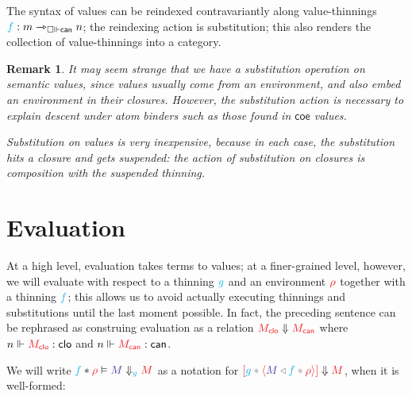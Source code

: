 \documentclass{article}
\DeclarePairedDelimiter\Parens{\lparen}{\rparen}
\newtheorem{remark}{Remark}
\newcommand\FmtKwd[1]{\mathsf{#1}}
\newcommand\FmtThin[1]{{\color{ProcessBlue}#1}}
\newcommand\XThin[3]{{#2}\rightarrowtriangle_{#1}{#3}}
\newcommand\IsXThin[4]{\FmtThin{#1}:\XThin{#2}{#3}{#4}}
\newcommand\FmtTm[1]{{\color{Violet}#1}}
\newcommand\FmtVal[1]{{\color{Red}{#1}}}
\begin{document}
The syntax of values can be reindexed contravariantly along
value-thinnings $\IsXThin{f}{\Val{\square}{\SortCan}}{m}{n}$; the
reindexing action is substitution; this also renders the collection of
value-thinnings into a category.

\begin{remark}
  It may seem strange that we have a substitution operation on
  semantic values, since values usually come from an environment, and
  also embed an environment in their closures. However, the
  substitution action is necessary to explain descent under
  \emph{atom} binders such as those found in $\FmtKwd{coe}$ values.

  Substitution on values is very inexpensive, because in each case,
  the substitution hits a closure and gets suspended: the action of
  substitution on closures is composition with the suspended thinning.
\end{remark}



\section{Evaluation}
\newcommand\EvalClo[2]{\FmtVal{#1}\Downarrow\FmtVal{#2}}
\newcommand\Eval[5]{\FmtThin{#2}*\FmtVal{#3}\vDash\FmtTm{#4}\mathrel{\Downarrow_{\FmtThin{#1}}}\FmtVal{#5}}
\newcommand\Apply[3]{\FmtVal{#1}\mathrel{@}\FmtVal{#2}\Downarrow\FmtVal{#3}}
\newcommand\InstClo[3]{\FmtVal{#1}\bullet\FmtVal{#2}\Downarrow\FmtVal{#3}}
\newcommand\ThinVal[2]{\widehat{\FmtThin{#1}}\Parens*{\FmtVal{#2}}}

At a high level, evaluation takes terms to values; at a finer-grained
level, however, we will evaluate with respect to a thinning
$\FmtThin{g}$ and an environment $\FmtVal{\rho}$ together with a
thinning $\FmtThin{f}$; this allows us to avoid actually executing
thinnings and substitutions until the last moment possible. In fact,
the preceding sentence can be rephrased as construing evaluation as a
relation $\EvalClo{M_\SortClo}{M_\SortCan}$ where
$\IsVal{n}{M_\SortClo}{\SortClo}$ and
$\IsVal{n}{M_\SortCan}{\SortCan}$.

We will write $\Eval{g}{f}{\rho}{M}{M}$ as a notation for
$\EvalClo{\Clo{g}{f}{\rho}{M}}{M}$, when it is well-formed:
\end{document}
